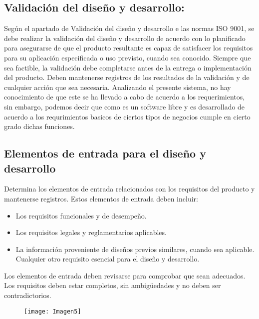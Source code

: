 \documentclass[11 pt]{article}
\begin{document}
\subsection{Validación del diseño y desarrollo:}
Según el apartado de Validación del diseño y desarrollo e las normas ISO 9001, se debe realizar la validación del diseño y desarrollo de acuerdo con lo planificado para asegurarse de que el producto resultante es capaz de satisfacer los requisitos para su aplicación especificada o uso previsto, cuando sea conocido. Siempre que sea factible, la validación debe completarse antes de la
entrega o implementación del producto. Deben mantenerse registros de los resultados de la validación y de cualquier acción que sea necesaria.
Analizando el presente sistema, no hay conocimiento de que este se ha llevado a cabo de acuerdo a los requerimientos, sin embargo, podemos decir que como es un software libre y es desarrollado de acuerdo a los requrimientos basicos de ciertos tipos de negocios cumple en cierto grado dichas funciones.
\vspace{1cm}

\subsection{Elementos de entrada para el diseño y desarrollo}
\vspace{0,5cm}
Determina  los elementos de entrada relacionados con los requisitos del producto y mantenerse registros. Estos elementos de entrada deben incluir:

\begin{itemize}
	\item Los requisitos funcionales y de desempeño.
	\item Los requisitos legales y reglamentarios aplicables.
	\item La información proveniente de diseños previos similares, cuando sea aplicable. Cualquier otro requisito esencial para el diseño y desarrollo.	
\end{itemize}
\vspace{0,5cm}
Los elementos de entrada deben revisarse para comprobar que sean adecuados. Los requisitos deben estar completos, sin ambigüedades y no deben ser contradictorios.
\begin{figure}[h]
	\centering
	\texttt{[image: Imagen5]}
\end{figure}

\vspace{1cm}
\end{document}
